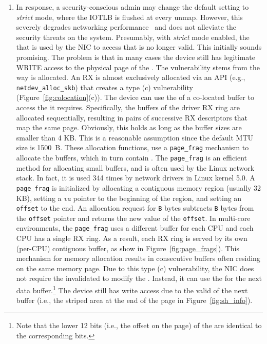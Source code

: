\begin{enumerate}[label=(\roman*),wide, labelwidth=!, labelindent=0pt]
\item In response, a security-conscious admin may change the default setting to \emph{strict} mode, where the IOTLB is flushed at every unmap. However, this severely degrades networking performance~\cite{MMT16,MSMT18} and does not alleviate the security threats on the system. Presumably, with \emph{strict} mode enabled, the \iova{} that is used by the NIC to access that \shinfo{} is no longer valid. This initially sounds promising. The problem is that in many cases the device still has legitimate WRITE access to the physical page of the \shinfo. The vulnerability stems from the way \data{} is allocated. An RX \skb{} is almost exclusively allocated via an API (e.g., \texttt{netdev\_alloc\_skb}) that creates a type (c) \subpage{} vulnerability (Figure~\ref{fig:colocation}(c)). The device can use the \iova{} of a co-located buffer to access the \shinfo{} it requires. Specifically, the buffers of the driver RX ring are allocated sequentially, resulting in pairs of successive RX descriptors that map the same page. Obviously, this holds as long as the buffer sizes are smaller than 4 KB. This is a reasonable assumption since the default MTU size is 1500~B. These allocation functions, use a \texttt{page\_frag} mechanism to allocate the \data{} buffers, which in turn contain \shinfo. The \texttt{page\_frag} is an efficient method for allocating small buffers, and is often used by the Linux network stack. In fact, it is used 344 times by network drivers in Linux kernel 5.0. A \texttt{page\_frag} is initialized by allocating a contiguous memory region (usually 32 KB), setting a \textit{va} pointer to the beginning of the region, and setting an \texttt{offset} to the end. An allocation request for \texttt{B} bytes subtracts \texttt{B} bytes from the \texttt{offset} pointer and returns the new value of the \texttt{offset}. In multi-core environments, the \texttt{page\_frag} uses a different buffer for each CPU and each CPU has a single RX ring. As a result, each RX ring is served by its own (per-CPU) contiguous buffer, as show in Figure~\ref{fig:page_frags}). This mechanism for memory allocation results in consecutive \data{} buffers often residing on the same memory page. Due to this type (c) \subpage{} vulnerability, the NIC does not require the invalidated \iova{} to modify the \shinfo. Instead, it can use the \iova{} for the next data buffer.\footnote{Note that the lower 12 bits (i.e., the offset on the page) of the \iova{} are identical to the corresponding \kva{} bits.} The device still has write access due to the valid \iova of the next buffer (i.e., the striped area at the end of the page in Figure~\ref{fig:sh_info}).
\end{enumerate}

